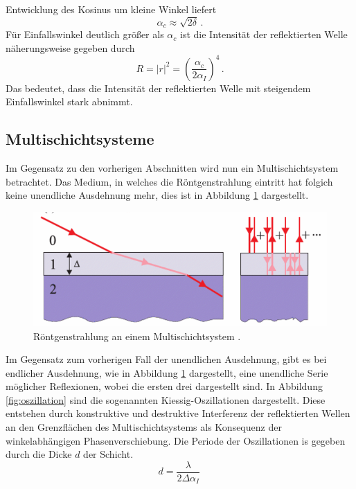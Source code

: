 Entwicklung des Kosinus um kleine Winkel liefert
\begin{equation}
    \alpha_c \approx \sqrt{2 \delta} \, .
    \label{eq:alpha_c}
\end{equation}
Für Einfallswinkel deutlich größer als $\alpha_c$ ist die Intensität der reflektierten Welle näherungsweise gegeben durch
\begin{equation}
    R = |r|^2 = \left(\frac{\alpha_c}{2 \alpha_I} \right)^4 \, .
    \label{eq:reflektivität_R}
\end{equation}
Das bedeutet, dass die Intensität der reflektierten Welle mit steigendem Einfallswinkel stark abnimmt.

\subsection{Multischichtsysteme} \label{sec:multischicht}
Im Gegensatz zu den vorherigen Abschnitten wird nun ein Multischichtsystem betrachtet.
Das Medium, in welches die Röntgenstrahlung eintritt hat folgich keine unendliche Ausdehnung mehr, 
dies ist in Abbildung \ref{fig:multischicht} dargestellt.
\begin{figure}[H]
    \centering
    \includegraphics[scale=0.5]{Bilder/multischicht.png}
    \caption{Röntgenstrahlung an einem Multischichtsystem \cite{als-nielsen2011}.}
    \label{fig:multischicht}
\end{figure}
Im Gegensatz zum vorherigen Fall der unendlichen Ausdehnung, gibt es bei endlicher Ausdehnung, 
wie in Abbildung \ref{fig:multischicht} dargestellt, 
eine unendliche Serie möglicher Reflexionen, wobei die ersten drei dargestellt sind.
In Abbildung \ref{fig:oszillation} sind die sogenannten Kiessig-Oszillationen dargestellt.
Diese entstehen durch konstruktive und destruktive Interferenz der reflektierten Wellen an den Grenzflächen des Multischichtsystems als Konsequenz der winkelabhängigen Phasenverschiebung.
Die Periode der Oszillationen is gegeben durch die Dicke $d$ der Schicht.
\begin{equation}
    d = \frac{\lambda}{2 \Delta \alpha_I} \, 
    \label{eq:dicke}
\end{equation}
